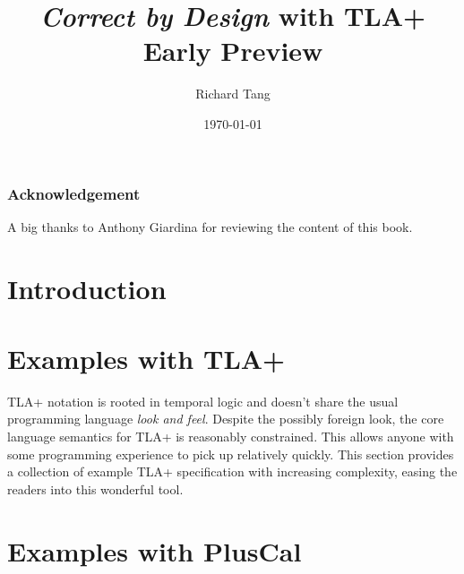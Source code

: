\documentclass{kdp}
\title{\textit{Correct by Design} with TLA+ \\ Early Preview}
\author{Richard Tang}
\date{\today}
\begin{document}
\maketitle


\section*{Acknowledgement}

A big thanks to Anthony Giardina for reviewing the content of this book.

\tableofcontents

\part{Introduction}





\part{Examples with TLA+}

TLA+ notation is rooted in temporal logic and doesn't share the usual
programming language \textit{look and feel}. Despite the possibly foreign look,
the core language semantics for TLA+ is reasonably constrained. This allows
anyone with some programming experience to pick up relatively quickly. This
section provides a collection of example TLA+ specification with increasing
complexity, easing the readers into this wonderful tool.

% 















\part{Examples with PlusCal}
\end{document}

